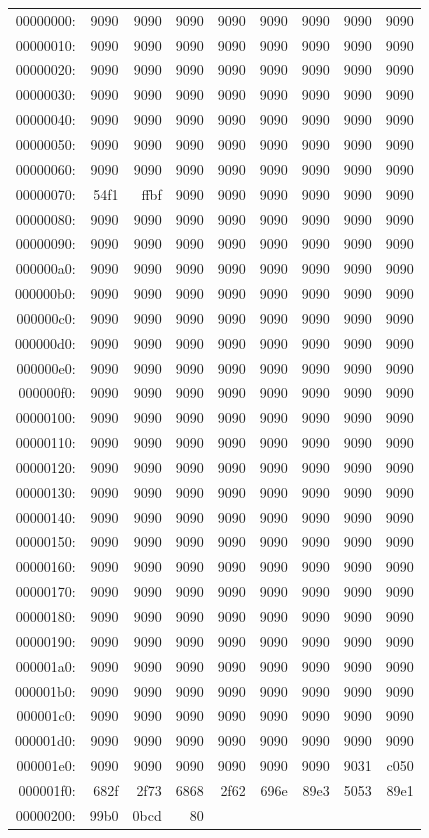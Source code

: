 \documentclass{article}
\begin{document}
\begin{tabular}{r r r r r r r r r}
00000000:&9090&9090&9090&9090&9090&9090&9090&9090\\
00000010:&9090&9090&9090&9090&9090&9090&9090&9090\\
00000020:&9090&9090&9090&9090&9090&9090&9090&9090\\
00000030:&9090&9090&9090&9090&9090&9090&9090&9090\\
00000040:&9090&9090&9090&9090&9090&9090&9090&9090\\
00000050:&9090&9090&9090&9090&9090&9090&9090&9090\\
00000060:&9090&9090&9090&9090&9090&9090&9090&9090\\
00000070:&\color{blue}54f1&\color{blue}ffbf&9090&9090&9090&9090&9090&9090\\
00000080:&9090&9090&9090&9090&9090&9090&9090&9090\\
00000090:&9090&9090&9090&9090&9090&9090&9090&9090\\
000000a0:&9090&9090&9090&9090&9090&9090&9090&9090\\
000000b0:&9090&9090&9090&9090&9090&9090&9090&9090\\
000000c0:&9090&9090&9090&9090&9090&9090&9090&9090\\
000000d0:&9090&9090&9090&9090&9090&9090&9090&9090\\
000000e0:&9090&9090&9090&9090&9090&9090&9090&9090\\
000000f0:&9090&9090&9090&9090&9090&9090&9090&9090\\
00000100:&9090&9090&9090&9090&9090&9090&9090&9090\\
00000110:&9090&9090&9090&9090&9090&9090&9090&9090\\
00000120:&9090&9090&9090&9090&9090&9090&9090&9090\\
00000130:&9090&9090&9090&9090&9090&9090&9090&9090\\
00000140:&9090&9090&9090&9090&9090&9090&9090&9090\\
00000150:&9090&9090&9090&9090&9090&9090&9090&9090\\
00000160:&9090&9090&9090&9090&9090&9090&9090&9090\\
00000170:&9090&9090&9090&9090&9090&9090&9090&9090\\
00000180:&9090&9090&9090&9090&9090&9090&9090&9090\\
00000190:&9090&9090&9090&9090&9090&9090&9090&9090\\
000001a0:&9090&9090&9090&9090&9090&9090&9090&9090\\
000001b0:&9090&9090&9090&9090&9090&9090&9090&9090\\
000001c0:&9090&9090&9090&9090&9090&9090&9090&9090\\
000001d0:&9090&9090&9090&9090&9090&9090&9090&9090\\
000001e0:&9090&9090&9090&9090&9090&9090&90\color{red}31&\color{red}c050\\
000001f0:&\color{red}682f&\color{red}2f73&\color{red}6868&\color{red}2f62&\color{red}696e&\color{red}89e3&\color{red}5053&\color{red}89e1\\
00000200:&\color{red}99b0&\color{red}0bcd&\color{red}80
\end{tabular}\\
\end{document}
